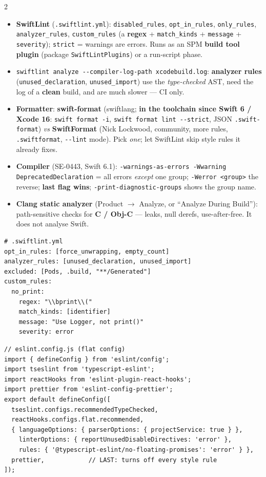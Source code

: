 \documentclass[8pt]{extarticle}
\newcommand\ct[1]{\texttt{#1}}
\newcommand\dd{\hbox{-}\hbox{-}}        %
\newcommand\hd[1]{\par\vspace{3pt}\noindent{\bfseries\color{sheetBlue}#1}\par\vspace{1pt}}
\begin{document}
\begin{multicols}{2}
\raggedright\footnotesize{}

\hd{Swift / iOS}
\begin{itemize}
  \item \textbf{SwiftLint} (\ct{.swiftlint.yml}): \ct{disabled\_rules}, \ct{opt\_in\_rules},
        \ct{only\_rules}, \ct{analyzer\_rules}, \ct{custom\_rules} (a \textbf{regex} +
        \ct{match\_kinds} + \ct{message} + \ct{severity}); \ct{strict} = warnings are errors.
        Runs as an SPM \textbf{build tool plugin} (package \ct{SwiftLintPlugins}) or a run-script phase.
  \item \ct{swiftlint analyze \dd{}compiler-log-path xcodebuild.log}: \textbf{analyzer rules}
        (\ct{unused\_declaration}, \ct{unused\_import}) use the \emph{type-checked} AST, need
        the log of a \textbf{clean} build, and are much slower — CI only.
  \item \textbf{Formatter}: \textbf{swift-format} (swiftlang; \textbf{in the toolchain since Swift 6 /
        Xcode 16}: \ct{swift format -i}, \ct{swift format lint \dd{}strict}, JSON
        \ct{.swift-format}) \emph{vs} \textbf{SwiftFormat} (Nick Lockwood, community, more rules,
        \ct{.swiftformat}, \ct{\dd{}lint} mode). Pick \emph{one}; let SwiftLint skip style rules it
        already fixes.
  \item \textbf{Compiler} (SE-0443, Swift 6.1): \ct{-warnings-as-errors -Wwarning
        DeprecatedDeclaration} = all errors \emph{except} one group; \ct{-Werror <group>} the
        reverse; \textbf{last flag wins}; \ct{-print-diagnostic-groups} shows the group name.
  \item \textbf{Clang static analyzer} (Product $\to$ Analyze, or ``Analyze During Build''):
        path-sensitive checks for \textbf{C / Obj-C} — leaks, null derefs, use-after-free.
        It does not analyse Swift.
\end{itemize}

\hd{Example — the two configs that matter}
\begin{lstlisting}[language=CfgSheet]
# .swiftlint.yml
opt_in_rules: [force_unwrapping, empty_count]
analyzer_rules: [unused_declaration, unused_import]
excluded: [Pods, .build, "**/Generated"]
custom_rules:
  no_print:
    regex: "\\bprint\\("
    match_kinds: [identifier]
    message: "Use Logger, not print()"
    severity: error
\end{lstlisting}
\begin{lstlisting}[language=CfgSheet]
// eslint.config.js (flat config)
import { defineConfig } from 'eslint/config';
import tseslint from 'typescript-eslint';
import reactHooks from 'eslint-plugin-react-hooks';
import prettier from 'eslint-config-prettier';
export default defineConfig([
  tseslint.configs.recommendedTypeChecked,
  reactHooks.configs.flat.recommended,
  { languageOptions: { parserOptions: { projectService: true } },
    linterOptions: { reportUnusedDisableDirectives: 'error' },
    rules: { '@typescript-eslint/no-floating-promises': 'error' } },
  prettier,            // LAST: turns off every style rule
]);
\end{lstlisting}


\end{multicols}
\end{document}
